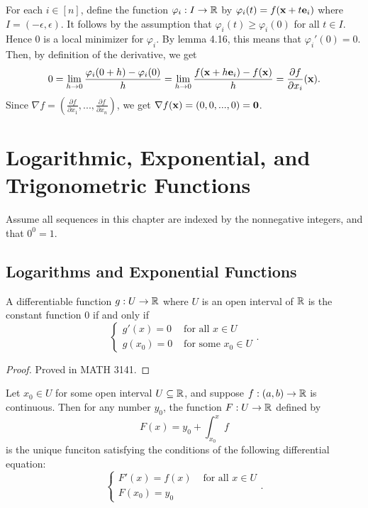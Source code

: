 \documentclass[letterpaper, twoside, 12pt]{book}
\begin{document}
\begin{solution}
    For each \(i \in [n]\), define the function \(\varphi_i: I \to \mathbb R\) 
    by \(\varphi_i(t) = f(\mathbf x + t \mathbf e_i)\) where \(I = (-\epsilon, \epsilon)\).
    It follows by the assumption that \(\varphi_i(t) \geq \varphi_i(0)\) 
    for all \(t \in I\). Hence \(0\) is a local minimizer for \(\varphi_i\).
    By lemma 4.16, this means that \(\varphi_i'(0) = 0\). Then, by definition
    of the derivative, we get
    \[ 0 = \lim_{h \to 0} \frac{ \varphi_i(0 + h) - \varphi_i(0)}{h} =
        \lim_{h \to 0} \frac{ f(\mathbf x + h \mathbf e_i) - f(\mathbf x)}{h} = 
    \frac{\partial f}{\partial x_i}(\mathbf x) .\]
    Since \(\nabla f = (\frac{\partial f}{\partial x_1},...,\frac{\partial f}{\partial x_n})\),
    we get \(\nabla f(\mathbf x) = (0,0,...,0) = \mathbf 0 \).

\end{solution}


\setcounter{chapter}{-1}
\chapter[Log, Exp, and Trig Functions]{Logarithmic, Exponential, and Trigonometric Functions}

Assume all sequences in this chapter are indexed by the nonnegative integers,
and that \(0^0=1\).

\section{Logarithms and Exponential Functions}

\begin{theorem}
  A differentiable function \(g:U\to\mathbb R\) where \(U\) is an open interval
  of \(\mathbb R\) is the constant function \(0\) if and only if
  \[
    \begin{cases}
      g'(x)=0 & \text{ for all } x\in U \\
      g(x_0)=0 & \text{ for some } x_0\in U
    \end{cases}
  .\]
\end{theorem}
\begin{proof}
  Proved in MATH 3141.
\end{proof}

\begin{proposition}[7.1]
  Let \(x_0\in U\) for some open interval \(U\subseteq\mathbb R\),
  and suppose \(f:(a,b)\to\mathbb R\) is continuous.
  Then for any number \(y_0\), the function \(F:U\to\mathbb R\) defined by
  \[
    F(x) = y_0 + \int_{x_0}^x f
  \]
  is the unique funciton satisfying
  the conditions of the following differential equation:
  \[
    \begin{cases}
      F'(x)=f(x) & \text{ for all } x\in U \\
      F(x_0)=y_0
    \end{cases}
  .\]
\end{proposition}
\end{document}

